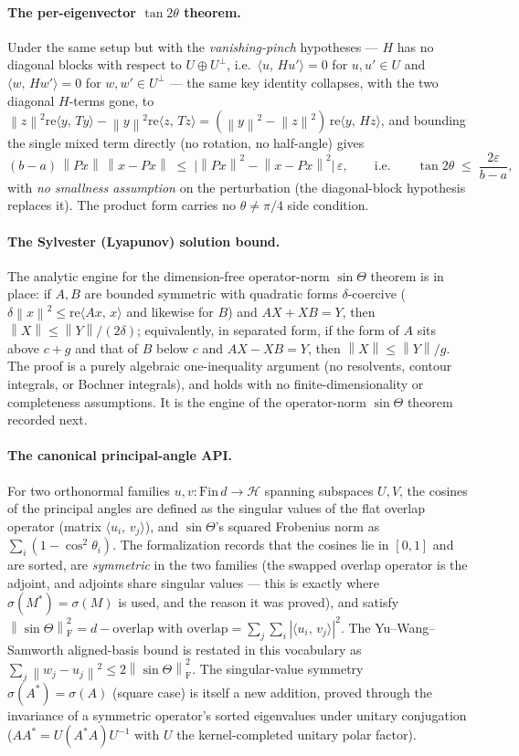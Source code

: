 \documentclass[11pt]{article}
\newcommand{\norm}[1]{\left\lVert #1\right\rVert}
\newcommand{\eps}{\varepsilon}
\newcommand{\F}{\mathrm{F}}
\newcommand{\inner}[2]{\langle #1,\,#2\rangle}
\newcommand{\gap}{g}
\newcommand{\HH}{\mathcal H}
\newcommand{\sinT}{\sin\Theta}
\theoremstyle{remark}
\begin{document}
\paragraph{The per-eigenvector $\tan2\theta$ theorem.}
Under the same setup but with the \emph{vanishing-pinch} hypotheses --- $H$ has
no diagonal blocks with respect to $U\oplus U^{\perp}$, i.e.\
$\inner{u}{Hu'}=0$ for $u,u'\in U$ and $\inner{w}{Hw'}=0$ for $w,w'\in
U^{\perp}$ --- the same key identity collapses, with the two diagonal
$H$-terms gone, to
$\norm{z}^2\mathrm{re}\inner{y}{Ty}-\norm{y}^2\mathrm{re}\inner{z}{Tz}
=(\norm{y}^2-\norm{z}^2)\,\mathrm{re}\inner{y}{Hz}$, and bounding the single
mixed term directly (no rotation, no half-angle) gives
\[
  (b-a)\,\norm{Px}\,\norm{x-Px}\;\le\;\bigl|\norm{Px}^2-\norm{x-Px}^2\bigr|\,\eps,
  \qquad\text{i.e.}\qquad
  \tan2\theta\;\le\;\frac{2\eps}{b-a},
\]
with \emph{no smallness assumption} on the perturbation (the diagonal-block
hypothesis replaces it).  The product form carries no $\theta\ne\pi/4$ side
condition.

\paragraph{The Sylvester (Lyapunov) solution bound.}
The analytic engine for the dimension-free operator-norm $\sin\Theta$ theorem
is in place: if $A,B$ are bounded symmetric with quadratic forms
$\delta$-coercive ($\delta\norm{x}^2\le\mathrm{re}\inner{Ax}{x}$ and likewise
for $B$) and $AX+XB=Y$, then $\norm{X}\le\norm{Y}/(2\delta)$; equivalently, in
separated form, if the form of $A$ sits above $c+\gap$ and that of $B$ below
$c$ and $AX-XB=Y$, then $\norm{X}\le\norm{Y}/\gap$.  The proof is a purely
algebraic one-inequality argument (no resolvents, contour integrals, or
Bochner integrals), and holds with no finite-dimensionality or completeness
assumptions.  It is the engine of the operator-norm $\sin\Theta$ theorem
recorded next.

\paragraph{The canonical principal-angle API.}
For two orthonormal families $u,v:\mathrm{Fin}\,d\to\HH$ spanning subspaces
$U,V$, the cosines of the principal angles are defined as the singular values
of the flat overlap operator (matrix $\inner{u_i}{v_j}$), and $\sin\Theta$'s
squared Frobenius norm as $\sum_i(1-\cos^2\theta_i)$.  The formalization records
that the cosines lie in $[0,1]$ and are sorted, are \emph{symmetric} in the two
families (the swapped overlap operator is the adjoint, and adjoints share
singular values --- this is exactly where $\sigma(M^{*})=\sigma(M)$ is used, and
the reason it was proved), and satisfy $\norm{\sinT}_{\F}^2=d-\mathrm{overlap}$
with $\mathrm{overlap}=\sum_j\sum_i|\inner{u_i}{v_j}|^2$.  The Yu--Wang--Samworth
aligned-basis bound is restated in this vocabulary as
$\sum_j\norm{w_j-u_j}^2\le2\norm{\sinT}_{\F}^2$.  The singular-value symmetry
$\sigma(A^{*})=\sigma(A)$ (square case) is itself a new addition, proved through
the invariance of a symmetric operator's sorted eigenvalues under unitary
conjugation ($AA^{*}=U(A^{*}A)U^{-1}$ with $U$ the kernel-completed unitary
polar factor).
\end{document}

